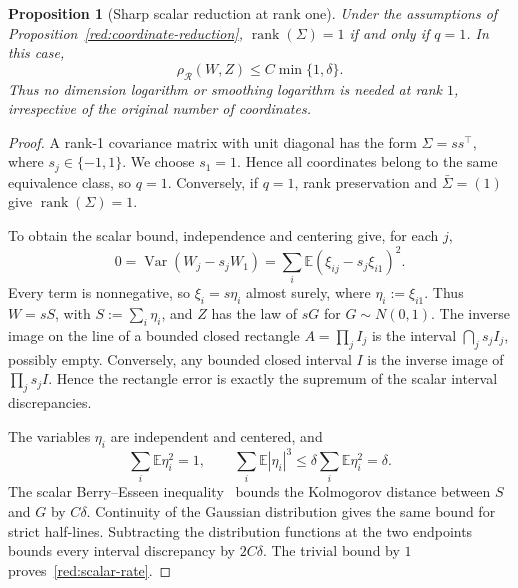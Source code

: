 \documentclass[11pt,a4paper]{article}
\newtheorem{proposition}{Proposition}
\theoremstyle{remark}
\newcommand{\E}{\mathbb E}
\newcommand{\Var}{\operatorname{Var}}
\newcommand{\rh}{\rho_{\mathcal R}}
\begin{document}
\begin{proposition}[Sharp scalar reduction at rank one]
\label{red:rank-one}
Under the assumptions of Proposition~\ref{red:coordinate-reduction},
\(\operatorname{rank}(\Sigma)=1\) if and only if \(q=1\).  In this case,
\begin{equation}
 \rh(W,Z)\le C\min\{1,\delta\}.
 \label{red:scalar-rate}
\end{equation}
Thus no dimension logarithm or smoothing logarithm is needed at rank
\(1\), irrespective of the original number of coordinates.
\end{proposition}

\begin{proof}
A rank-1 covariance matrix with unit diagonal has the form
\(\Sigma=ss^\top\), where \(s_j\in\{-1,1\}\). We choose \(s_1=1\).
Hence all coordinates belong to the same equivalence class, so \(q=1\).
Conversely, if \(q=1\), rank preservation and \(\bar\Sigma=(1)\)
give \(\operatorname{rank}(\Sigma)=1\).

To obtain the scalar bound, independence and centering give, for each \(j\),
\[
 0=\Var(W_j-s_jW_1)
   =\sum_i\E(\xi_{ij}-s_j\xi_{i1})^2.
\]
Every term is nonnegative, so \(\xi_i=s\eta_i\) almost surely, where
\(\eta_i:=\xi_{i1}\). Thus \(W=sS\), with
\(S:=\sum_i\eta_i\), and \(Z\) has the law of \(sG\)
for \(G\sim N(0,1)\).
The inverse image on the line of a bounded closed rectangle
\(A=\prod_j I_j\) is the interval \(\bigcap_j s_j I_j\), possibly empty.
Conversely, any bounded closed interval \(I\) is the inverse image
of \(\prod_j s_j I\). Hence the rectangle error is exactly the
supremum of the scalar interval discrepancies.

The variables \(\eta_i\) are independent and centered, and
\[
 \sum_i\E\eta_i^2=1,\qquad
 \sum_i\E|\eta_i|^3\le\delta\sum_i\E\eta_i^2=\delta.
\]
The scalar Berry--Esseen inequality~\cite{Berry1941} bounds the
Kolmogorov distance between \(S\) and \(G\) by \(C\delta\).
Continuity of the Gaussian distribution gives the same bound for
strict half-lines. Subtracting the distribution functions at the two
endpoints bounds every interval discrepancy by \(2C\delta\).
The trivial bound by \(1\) proves~\eqref{red:scalar-rate}.
\end{proof}
\end{document}

